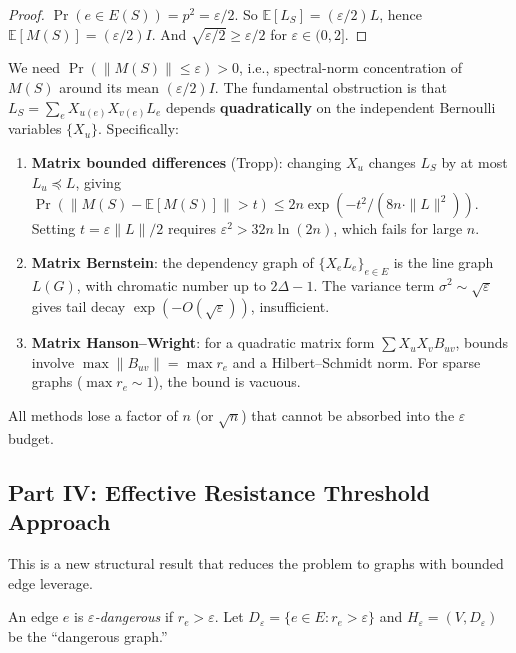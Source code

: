 \begin{proof}
$\Pr(e\in E(S))=p^2=\varepsilon/2$. So $\mathbb E[L_S]=(\varepsilon/2)L$, hence $\mathbb E[M(S)]=(\varepsilon/2)I$. And $\sqrt{\varepsilon/2}\ge\varepsilon/2$ for $\varepsilon\in(0,2]$.
\end{proof}

\begin{remark}
We need $\Pr(\|M(S)\|\le\varepsilon)>0$, i.e., spectral-norm concentration of $M(S)$ around its mean $(\varepsilon/2)I$. The fundamental obstruction is that $L_S=\sum_{e}X_{u(e)}X_{v(e)}L_e$ depends \textbf{quadratically} on the independent Bernoulli variables $\{X_u\}$. Specifically:
\begin{enumerate}
\item \textbf{Matrix bounded differences} (Tropp): changing $X_u$ changes $L_S$ by at most $L_u\preceq L$, giving $\Pr(\|M(S)-\mathbb E[M(S)]\|>t)\le 2n\exp(-t^2/(8n\cdot\|L\|^2))$. Setting $t=\varepsilon\|L\|/2$ requires $\varepsilon^2>32n\ln(2n)$, which fails for large $n$.
\item \textbf{Matrix Bernstein}: the dependency graph of $\{X_eL_e\}_{e\in E}$ is the line graph $L(G)$, with chromatic number up to $2\Delta-1$. The variance term $\sigma^2\sim\sqrt\varepsilon$ gives tail decay $\exp(-O(\sqrt\varepsilon))$, insufficient.
\item \textbf{Matrix Hanson--Wright}: for a quadratic matrix form $\sum X_uX_v B_{uv}$, bounds involve $\max\|B_{uv}\|=\max r_e$ and a Hilbert--Schmidt norm. For sparse graphs ($\max r_e\sim 1$), the bound is vacuous.
\end{enumerate}
All methods lose a factor of $n$ (or $\sqrt{n}$) that cannot be absorbed into the $\varepsilon$ budget.
\end{remark}

\subsection*{Part IV: Effective Resistance Threshold Approach}

This is a new structural result that reduces the problem to graphs with bounded edge leverage.

\begin{definition}
An edge $e$ is \emph{$\varepsilon$-dangerous} if $r_e>\varepsilon$. Let $D_\varepsilon=\{e\in E:r_e>\varepsilon\}$ and $H_\varepsilon=(V,D_\varepsilon)$ be the ``dangerous graph.''
\end{definition}

